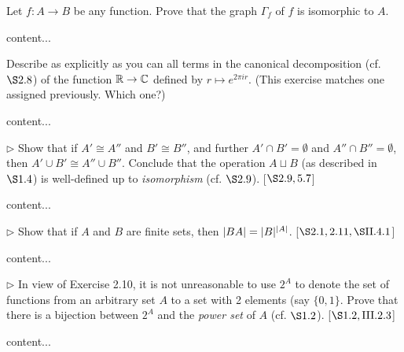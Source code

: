 \begin{exercise}
	Let \(f \colon A \to B\) be any function. Prove that the graph \(\Gamma_f\) of \(f\) is isomorphic to \(A\).
\end{exercise}
\begin{solution}
	content...
\end{solution}

\begin{exercise}
	Describe as explicitly as you can all terms in the canonical decomposition (cf. \(\S 2.8\)) of the function \(\mathbb{R} \to \mathbb{C}\) defined by \(r \mapsto e^{2\pi ir}\). (This exercise matches one assigned previously. Which one?)
\end{exercise}
\begin{solution}
	content...
\end{solution}

\begin{exercise}
	\(\triangleright\) Show that if \(A' \cong A''\) and \(B' \cong B''\), and further \(A' \cap B' = \emptyset\) and \(A'' \cap B'' = \emptyset\), then \(A' \cup B' \cong A'' \cup B''\). Conclude that the operation \(A \sqcup B\) (as described in \(\S 1.4\)) is well-defined up to \textit{isomorphism} (cf. \(\S 2.9\)). [\(\S 2.9, 5.7\)]
\end{exercise}
\begin{solution}
	content...
\end{solution}

\begin{exercise}
	\(\triangleright\) Show that if \(A\) and \(B\) are finite sets, then \(\lvert BA\rvert = \lvert B\rvert^{\lvert A\rvert}\). [\(\S 2.1, 2.11, \S \RN{2}.4.1\)]
\end{exercise}
\begin{solution}
	content...
\end{solution}

\begin{exercise}
	\(\triangleright\) In view of Exercise 2.10, it is not unreasonable to use \(2^A\) to denote the set of functions from an arbitrary set \(A\) to a set with 2 elements (say \(\{0, 1\}\). Prove that there is a bijection between \(2^A\) and the \textit{power set} of \(A\) (cf. \(\S 1.2\)). [\(\S 1.2, \RN{3}.2.3\)]
\end{exercise}
\begin{solution}
	content...
\end{solution}
